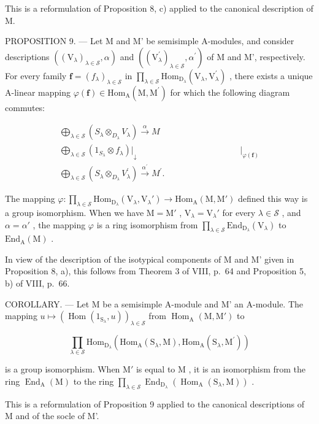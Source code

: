 This is a reformulation of Proposition 8, c) applied to the canonical description of M.

PROPOSITION 9. --- Let M and M' be semisimple A-modules, and consider descriptions \(((\mathrm{V}_{\lambda})_{\lambda\in\mathcal{S}},\alpha)\) and \(((\mathrm{V}_{\lambda}^{\prime})_{\lambda\in\mathcal{S}},\alpha^{\prime})\) of M and M', respectively. For every family \(\boldsymbol{f}=(f_{\lambda})_{\lambda\in\mathcal{S}}\) in \(\prod_{\lambda\in\mathcal{S}}\mathrm{Hom}_{\mathrm{D}_{\lambda}}(\mathrm{V}_{\lambda},\mathrm{V}_{\lambda}^{\prime})\) , there exists a unique A-linear mapping \(\varphi(\boldsymbol{f})\in\mathrm{Hom}_{\mathrm{A}}(\mathrm{M},\mathrm{M}^{\prime})\) for which the following diagram commutes:

\[
\begin{array}{c} \bigoplus_ {\lambda \in \mathscr {S}} (S _ {\lambda} \otimes_ {D _ {\lambda}} V _ {\lambda}) \xrightarrow {\alpha} M \\ \bigoplus_ {\lambda \in \mathscr {S}} (1 _ {S _ {\lambda}} \otimes f _ {\lambda}) \Bigg | _ {\downarrow} \qquad \qquad \qquad \qquad \qquad \qquad \Bigg | _ {\varphi (\boldsymbol {f})} \\ \bigoplus_ {\lambda \in \mathscr {S}} (S _ {\lambda} \otimes_ {D _ {\lambda}} V _ {\lambda} ^ {\prime}) \xrightarrow {\alpha^ {\prime}} M ^ {\prime}. \end{array}
\]

The mapping \(\varphi : \prod_{\lambda \in \mathcal{S}} \mathrm{Hom}_{\mathrm{D}_{\lambda}}(\mathrm{V}_{\lambda}, \mathrm{V}_{\lambda}') \to \mathrm{Hom}_{\mathrm{A}}(\mathrm{M}, \mathrm{M}')\) defined this way is a group isomorphism. When we have \(\mathrm{M} = \mathrm{M}'\) , \(\mathrm{V}_{\lambda} = \mathrm{V}_{\lambda}'\) for every \(\lambda \in \mathcal{S}\) , and \(\alpha = \alpha'\) , the mapping \(\varphi\) is a ring isomorphism from \(\prod_{\lambda \in \mathcal{S}} \mathrm{End}_{\mathrm{D}_{\lambda}}(\mathrm{V}_{\lambda})\) to \(\mathrm{End}_{\mathrm{A}}(\mathrm{M})\) .

In view of the description of the isotypical components of M and M' given in Proposition 8, a), this follows from Theorem 3 of VIII, p.~64 and Proposition 5, b) of VIII, p.~66.

COROLLARY. --- Let M be a semisimple A-module and M' an A-module. The mapping \(u \mapsto (\operatorname{Hom}(1_{\mathrm{S}_{\lambda}}, u))_{\lambda \in \mathcal{S}}\) from \(\operatorname{Hom}_{\mathrm{A}}(\mathrm{M}, \mathrm{M}')\) to

\[
\prod_ {\lambda \in \mathcal {S}} \mathrm{Hom} _ {\mathrm{D} _ {\lambda}} (\mathrm{Hom} _ {\mathrm{A}} (\mathrm{S} _ {\lambda}, \mathrm{M}), \mathrm{Hom} _ {\mathrm{A}} (\mathrm{S} _ {\lambda}, \mathrm{M} ^ {\prime}))
\]

is a group isomorphism. When \(\mathrm{M}'\) is equal to \(\mathrm{M}\) , it is an isomorphism from the ring \(\operatorname{End}_{\mathrm{A}}(\mathrm{M})\) to the ring \(\prod_{\lambda \in \mathcal{S}} \operatorname{End}_{\mathrm{D}_{\lambda}}(\operatorname{Hom}_{\mathrm{A}}(\mathrm{S}_{\lambda}, \mathrm{M}))\) .

This is a reformulation of Proposition 9 applied to the canonical descriptions of M and of the socle of M'.

